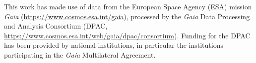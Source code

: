\documentclass[fleqn,usenatbib,letters]{mnras}%
\begin{document}
This work has made use of data from the European Space Agency (ESA) mission {\it Gaia} (\url{https://www.cosmos.esa.int/gaia}), processed by the {\it Gaia} Data Processing and Analysis Consortium (DPAC, \url{https://www.cosmos.esa.int/web/gaia/dpac/consortium}). Funding for the DPAC has been provided by national institutions, in particular the institutions participating in the {\it Gaia} Multilateral Agreement.










%
%




\bsp	%
\label{lastpage}
\end{document}
